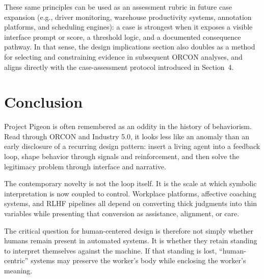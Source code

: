 \documentclass[runningheads]{llncs}
\begin{document}
These same principles can be used as an assessment rubric in future case expansion (e.g., driver monitoring, warehouse productivity systems, annotation platforms, and scheduling engines): a case is strongest when it exposes a visible interface prompt or score, a threshold logic, and a documented consequence pathway. In that sense, the design implications section also doubles as a method for selecting and constraining evidence in subsequent ORCON analyses, and aligns directly with the case-assessment protocol introduced in Section~4.

\section{Conclusion}

Project Pigeon is often remembered as an oddity in the history of behaviorism. Read through ORCON and Industry 5.0, it looks less like an anomaly than an early disclosure of a recurring design pattern: insert a living agent into a feedback loop, shape behavior through signals and reinforcement, and then solve the legitimacy problem through interface and narrative.

The contemporary novelty is not the loop itself. It is the scale at which symbolic interpretation is now coupled to control. Workplace platforms, affective coaching systems, and RLHF pipelines all depend on converting thick judgments into thin variables while presenting that conversion as assistance, alignment, or care.

The critical question for human-centered design is therefore not simply whether humans remain present in automated systems. It is whether they retain standing to interpret themselves against the machine. If that standing is lost, ``human-centric'' systems may preserve the worker's body while enclosing the worker's meaning.
\end{document}
